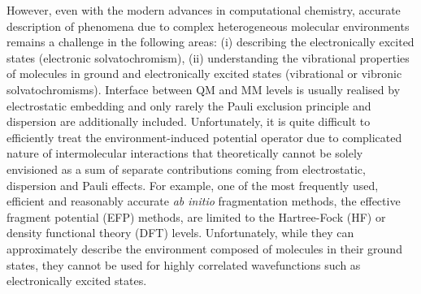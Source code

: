 \documentclass[aip,amsmath,amssymb,reprint,floatfix]{revtex4-1}
\begin{document}
However, even with the modern advances in computational chemistry, accurate description of phenomena due 
to complex heterogeneous molecular environments remains a challenge in the following areas: (i) describing 
the electronically excited states (electronic solvatochromism),\cite{Barbati.JACS.2014,
Szabla.Sponer.Jiri.Gora.JPCL.2015,Bednarska.Zalesny.Tian.Murugan.Agren.Bartkowiak.Molecules.2017,
Jedrzejewska.Grabarz.Bartkowiak.Osmialowski.SpectChimActA.2018} 
(ii) understanding the vibrational properties of molecules in ground and electronically excited states
(vibrational or vibronic solvatochromisms).\cite{Blasiak.Londergan.Webb.Cho.ACR.2017,
Xu.Blasiak.Cho.Layfield.Londergan.JPCL.2018} 
Interface between QM and MM levels is usually realised by electrostatic embedding and only rarely 
the Pauli exclusion principle and dispersion are additionally included.\cite{List.Olsen.Kongsted.PCCP.2016}
Unfortunately, it is quite difficult to efficiently treat the environment\hyp{}induced potential operator
due to complicated nature of intermolecular interactions that theoretically cannot be solely envisioned 
as a sum of separate contributions coming from electrostatic, dispersion and Pauli 
effects.\cite{Jeziorski.Moszynski.Szalewicz.ChemRev.1994} 
For example,
one of the most frequently used, efficient and reasonably accurate \emph{ab initio} fragmentation methods, 
the effective fragment potential (EFP) methods, are limited to the Hartree\hyp{}Fock 
(HF)\cite{Roothaan.RevModPhys.1951,Gordon.Smith.Xu.Slipchenko.AnnuRevPhysChem.2013} 
or density functional theory (DFT) levels\cite{Hohenberg.Kohn.PhysRev.1964,Kohn.Sham.PhysRev.1965,Nguyen.Pachter.Day.JCP.2014}.
Unfortunately, while they can approximately describe the environment composed of molecules in their ground states,
they cannot be used for highly correlated wavefunctions such as electronically excited states.
\end{document}
